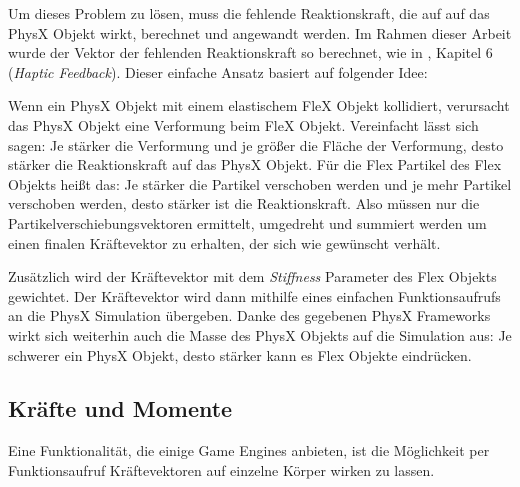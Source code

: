 
Um dieses Problem zu lösen, muss die fehlende Reaktionskraft, die auf auf das PhysX Objekt wirkt, berechnet und angewandt werden. 
Im Rahmen dieser Arbeit wurde der Vektor der fehlenden Reaktionskraft so berechnet, wie in \cite{VRSim20}, Kapitel 6 (\textit{Haptic Feedback}). Dieser einfache Ansatz basiert auf folgender Idee: 

Wenn ein PhysX Objekt mit einem elastischem FleX Objekt kollidiert, verursacht das PhysX Objekt eine Verformung beim FleX Objekt. Vereinfacht lässt sich sagen: Je stärker die Verformung und je größer die Fläche der Verformung, desto stärker die Reaktionskraft auf das PhysX Objekt. Für die Flex Partikel des Flex Objekts heißt das: Je stärker die Partikel verschoben werden und je mehr Partikel verschoben werden, desto stärker ist die Reaktionskraft. Also müssen nur die Partikelverschiebungsvektoren ermittelt, umgedreht und summiert werden um einen finalen Kräftevektor zu erhalten, der sich wie gewünscht verhält. 

Zusätzlich wird der Kräftevektor mit dem \textit{Stiffness} Parameter des Flex Objekts gewichtet.
Der Kräftevektor wird dann mithilfe eines einfachen Funktionsaufrufs an die PhysX Simulation übergeben. Danke des gegebenen PhysX Frameworks wirkt sich weiterhin auch die Masse des PhysX Objekts auf die Simulation aus: Je schwerer ein PhysX Objekt, desto stärker kann es Flex Objekte eindrücken.

\subsection{Kräfte und Momente}

Eine Funktionalität, die einige Game Engines anbieten, ist die Möglichkeit per Funktionsaufruf Kräftevektoren auf einzelne Körper wirken zu lassen. 

